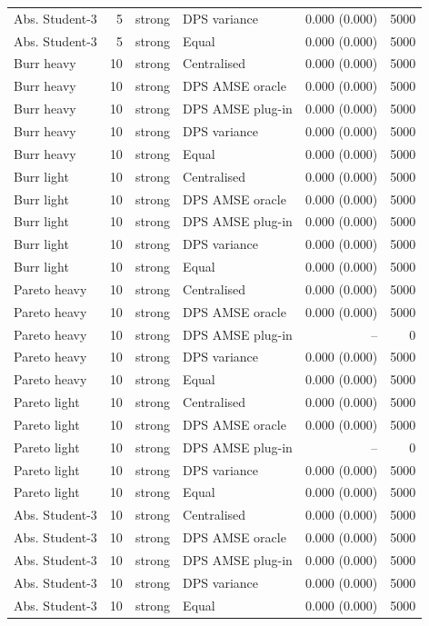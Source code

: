 \begin{tabular}{lrllrr}
Abs. Student-3 & 5 & strong & DPS variance & 0.000 (0.000) & 5000 \\
Abs. Student-3 & 5 & strong & Equal & 0.000 (0.000) & 5000 \\
Burr heavy & 10 & strong & Centralised & 0.000 (0.000) & 5000 \\
Burr heavy & 10 & strong & DPS AMSE oracle & 0.000 (0.000) & 5000 \\
Burr heavy & 10 & strong & DPS AMSE plug-in & 0.000 (0.000) & 5000 \\
Burr heavy & 10 & strong & DPS variance & 0.000 (0.000) & 5000 \\
Burr heavy & 10 & strong & Equal & 0.000 (0.000) & 5000 \\
Burr light & 10 & strong & Centralised & 0.000 (0.000) & 5000 \\
Burr light & 10 & strong & DPS AMSE oracle & 0.000 (0.000) & 5000 \\
Burr light & 10 & strong & DPS AMSE plug-in & 0.000 (0.000) & 5000 \\
Burr light & 10 & strong & DPS variance & 0.000 (0.000) & 5000 \\
Burr light & 10 & strong & Equal & 0.000 (0.000) & 5000 \\
Pareto heavy & 10 & strong & Centralised & 0.000 (0.000) & 5000 \\
Pareto heavy & 10 & strong & DPS AMSE oracle & 0.000 (0.000) & 5000 \\
Pareto heavy & 10 & strong & DPS AMSE plug-in & -- & 0 \\
Pareto heavy & 10 & strong & DPS variance & 0.000 (0.000) & 5000 \\
Pareto heavy & 10 & strong & Equal & 0.000 (0.000) & 5000 \\
Pareto light & 10 & strong & Centralised & 0.000 (0.000) & 5000 \\
Pareto light & 10 & strong & DPS AMSE oracle & 0.000 (0.000) & 5000 \\
Pareto light & 10 & strong & DPS AMSE plug-in & -- & 0 \\
Pareto light & 10 & strong & DPS variance & 0.000 (0.000) & 5000 \\
Pareto light & 10 & strong & Equal & 0.000 (0.000) & 5000 \\
Abs. Student-3 & 10 & strong & Centralised & 0.000 (0.000) & 5000 \\
Abs. Student-3 & 10 & strong & DPS AMSE oracle & 0.000 (0.000) & 5000 \\
Abs. Student-3 & 10 & strong & DPS AMSE plug-in & 0.000 (0.000) & 5000 \\
Abs. Student-3 & 10 & strong & DPS variance & 0.000 (0.000) & 5000 \\
Abs. Student-3 & 10 & strong & Equal & 0.000 (0.000) & 5000 \\
\bottomrule
\end{tabular}
